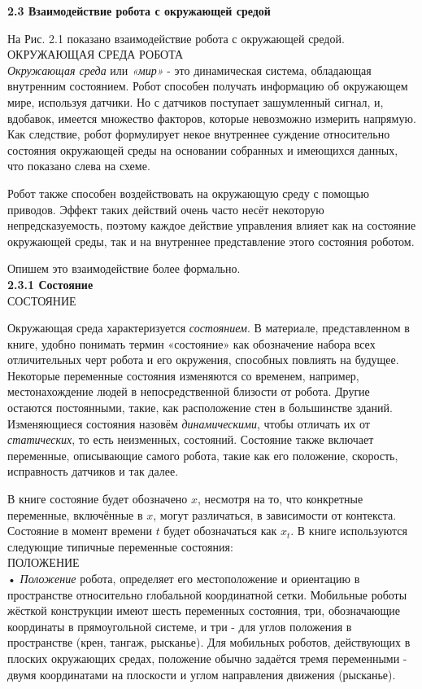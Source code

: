 \documentclass[10pt,a4paper]{article}
\begin{document}
\textbf{ 2.3 Взаимодействие робота с окружающей средой}

 На Рис. 2.1 показано взаимодействие робота с окружающей средой.\\ 
 ОКРУЖАЮЩАЯ СРЕДА РОБОТА\\
 \textit{Окружающая среда} или \textit{«мир»} - это динамическая система, обладающая внутренним состоянием.
 Робот способен получать информацию об окружающем мире, используя датчики. 
 Но с датчиков поступает зашумленный сигнал, и, вдобавок, имеется множество факторов, которые невозможно измерить напрямую. 
 Как следствие, робот формулирует некое внутреннее суждение относительно состояния окружающей среды на основании собранных и имеющихся данных, что показано слева на схеме.
  
 Робот также способен воздействовать на окружающую среду с помощью приводов. Эффект таких действий очень часто несёт некоторую непредсказуемость, поэтому каждое действие управления влияет как на состояние окружающей среды, так и на внутреннее представление этого состояния роботом.
  
 Опишем это взаимодействие более формально.\\
 
 \textbf{2.3.1 Состояние}\\
 
 СОСТОЯНИЕ
 
 Окружающая среда характеризуется \textit{состоянием}. В материале, представленном в книге, удобно понимать термин «состояние» как обозначение набора всех отличительных черт робота и его окружения, способных повлиять на будущее. Некоторые переменные состояния изменяются со временем, например, местонахождение людей в непосредственной близости от робота. Другие остаются постоянными, такие, как расположение стен в большинстве зданий.
 Изменяющиеся состояния назовём \textit{динамическими}, чтобы отличать их от \textit{статических}, то есть неизменных, состояний. Состояние также включает переменные, описывающие самого робота, такие как его положение, скорость, исправность датчиков и так далее.
  
 В книге состояние будет обозначено $x$, несмотря на то, что конкретные переменные, включённые в $x$, могут различаться, в зависимости от контекста. Состояние в момент времени $t$ будет обозначаться как $x_t$. В книге используются следующие типичные переменные состояния:\\
 
 ПОЛОЖЕНИЕ\\
 • \textit{Положение} робота, определяет его местоположение и ориентацию в пространстве относительно глобальной координатной сетки.
 Мобильные роботы жёсткой конструкции имеют шесть переменных состояния, три, обозначающие координаты в прямоугольной системе, и три - для углов положения в пространстве (крен, тангаж, рысканье). Для мобильных роботов, действующих в плоских окружающих средах, положение обычно задаётся тремя переменными - двумя координатами на плоскости и углом направления движения (рысканье).\\
 
\end{document}
